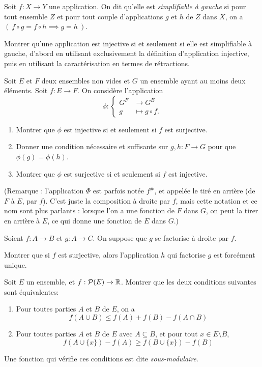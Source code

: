 \begin{exercice}
Soit $f : X\to Y$ une application. On dit qu'elle est \emph{simplifiable à gauche} si pour tout ensemble $Z$ et pour tout couple d'applications $g$ et $h$ de $Z$ dans $X$, on a $(\: f\circ g = f\circ h \implies g=h \: )$.

Montrer qu'une application est injective si et seulement si elle est simplifiable à gauche, d'abord en utilisant exclusivement la définition d'application injective, puis en utilisant la caractérisation en termes de rétractions.
\end{exercice}

\begin{exercice}
Soit $E$ et $F$ deux ensembles non vides et $G$ un ensemble ayant au moins deux éléments. Soit $f : E \to F$. On considère l'application
\[ \phi : \begin{cases}G^F&\to G^E\\ g&\mapsto g\circ f.\end{cases}\]
\begin{enumerate}
\item Montrer que $\phi$ est injective si et seulement si $f$ est surjective.
\item Donner une condition nécessaire et suffisante sur $g, h : F \to G$ pour que $\phi(g) = \phi(h)$.
\item Montrer que $\phi$ est surjective si et seulement si $f$ est injective.
  \end{enumerate}
(Remarque : l'application $\Phi$ est parfois notée $f^\#$, et appelée le \og tiré en arrière (de $F$ à $E$, par $f$)\fg. C'est juste la composition à droite par $f$, mais cette notation et ce nom sont plus parlants : lorsque l'on a une fonction de $F$ dans $G$, on peut la \og tirer en arrière à $E$\fg, ce qui donne une fonction de $E$ dans $G$.)
\end{exercice}

\begin{exercice}
Soient $f : A\to B$ et $g : A\to C$. On suppose que $g$ se factorise à droite par $f$.

Montrer que si $f$ est surjective, alors l'application $h$ qui factorise $g$ est forcément unique.
\end{exercice}

\begin{exercice}
Soit $E$ un ensemble, et $f : \mathcal P(E) \to \mathbb{R}$. Montrer que les deux conditions suivantes sont équivalentes:
\begin{enumerate}
\item Pour toutes parties $A$ et $B$ de $E$, on a 
\[
f(A\cup B) \leq f(A)+f(B)-f(A\cap B)
\]
\item Pour toutes parties $A$ et $B$ de $E$ avec $A\subseteq B$, et pour tout $x\in E\setminus B$,
\[
f(A\cup \{x\}) - f(A) \geq f(B\cup \{x\}) - f(B)
\]
\end{enumerate}
Une fonction qui vérifie ces conditions est dite \emph{sous-modulaire}.
\end{exercice}

